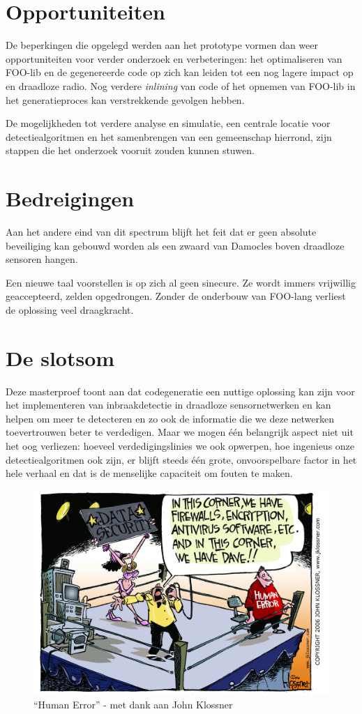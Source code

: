 \section{Opportuniteiten}
\label{section:opportunities}

De beperkingen die opgelegd werden aan het prototype vormen dan weer
opportuniteiten voor verder onderzoek en verbeteringen: het optimaliseren van
FOO-lib en de gegenereerde code op zich kan leiden tot een nog lagere impact op
\mcu en draadloze radio. Nog verdere \emph{inlining} van code of het opnemen
van FOO-lib in het generatieproces kan verstrekkende gevolgen hebben.

De mogelijkheden tot verdere analyse en simulatie, een centrale locatie voor
detectiealgoritmen en het samenbrengen van een gemeenschap hierrond, zijn
stappen die het onderzoek vooruit zouden kunnen stuwen.

\vspace{-2mm}

\section{Bedreigingen}
\label{section:threaths}

Aan het andere eind van dit spectrum blijft het feit dat er geen absolute
beveiliging kan gebouwd worden als een zwaard van Damocles boven draadloze
sensoren hangen.

Een nieuwe taal voorstellen is op zich al geen sinecure. Ze wordt immers
vrijwillig geaccepteerd, zelden opgedrongen. Zonder de onderbouw van FOO-lang
verliest de oplossing veel draagkracht.

\vspace{-2mm}

\section{De slotsom}
\label{section:bottom-line}

Deze masterproef toont aan dat codegeneratie een nuttige oplossing kan zijn
voor het implementeren van inbraakdetectie in draadloze sensornetwerken en kan
helpen om meer te detecteren en zo ook de informatie die we deze netwerken
toevertrouwen beter te verdedigen. Maar we mogen \'e\'en belangrijk aspect niet
uit het oog verliezen: hoeveel verdedigingslinies we ook opwerpen, hoe
ingenieus onze detectiealgoritmen ook zijn, er blijft steeds \'e\'en grote,
onvoorspelbare factor in het hele verhaal en dat is de menselijke capaciteit om
fouten te maken.

\begin{figure}[ht]
  \centering
  \includegraphics[width=0.71\linewidth]{resources/cartoon_human_error.jpg}
  \caption[``Human Error'']{``Human Error'' - met dank aan John Klossner}
\end{figure}
